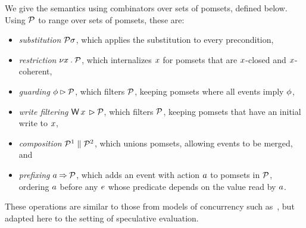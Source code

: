 We give the semantics using combinators over sets of pomsets, defined below.
Using $\mathcal{P}$ to range over sets of pomsets, these are:
\begin{itemize}
\item \emph{substitution} $\mathcal{P}\sigma$, which applies the substitution to
  every precondition,
\item \emph{restriction} $\nu x\mathbin.\mathcal{P}$, which internalizes $x$ for
  pomsets that are $x$-closed and $x$-coherent,
\item \emph{guarding} $\phi\mathbin\rhd\mathcal{P}$, which filters $\mathcal{P}$,
  keeping pomsets where all events imply $\phi$,
\item \emph{write filtering} $\DW{\aLoc}{}\guard\aPSS$, which filters
  $\mathcal{P}$, keeping pomsets that have an initial write to $x$,
\item \emph{composition} $\mathcal{P}^1\parallel\mathcal{P}^2$, which unions pomsets, allowing events to be merged, and
\item \emph{prefixing} $a\mathbin\Rightarrow\mathcal{P}$, which adds an event with action
  $a$ to pomsets in $\mathcal{P}$, ordering $a$ before any $e$ whose predicate
  depends on the value read by $a$.
\end{itemize}
These operations are similar to those from models of concurrency such
as~\cite{Brookes:1984:TCS:828.833}, but adapted here to the setting of
speculative evaluation.






